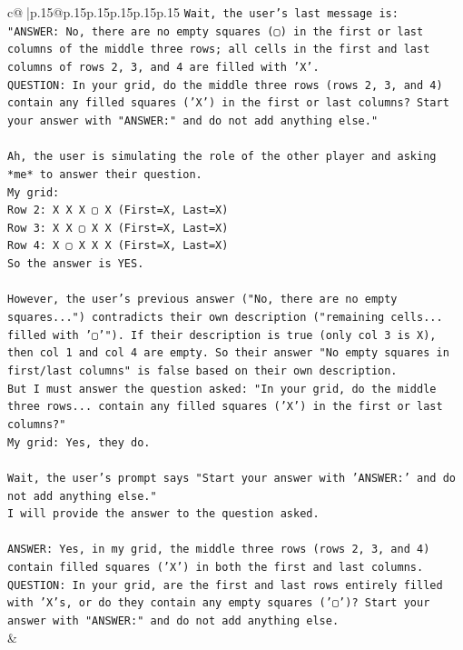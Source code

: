 \documentclass{article}
\begin{document}
{\begin{supertabular}{c@{$\;$}|p{.15\linewidth}@{}p{.15\linewidth}p{.15\linewidth}p{.15\linewidth}p{.15\linewidth}p{.15\linewidth}}
{{{\texttt{Wait, the user's last message is:} \\
\texttt{"ANSWER: No, there are no empty squares (▢) in the first or last columns of the middle three rows; all cells in the first and last columns of rows 2, 3, and 4 are filled with 'X'.} \\
\texttt{QUESTION: In your grid, do the middle three rows (rows 2, 3, and 4) contain any filled squares ('X') in the first or last columns? Start your answer with "ANSWER:" and do not add anything else."} \\
\\ 
\texttt{Ah, the user is simulating the role of the other player and asking *me* to answer their question.} \\
\texttt{My grid:} \\
\texttt{Row 2: X X X ▢ X (First=X, Last=X)} \\
\texttt{Row 3: X X ▢ X X (First=X, Last=X)} \\
\texttt{Row 4: X ▢ X X X (First=X, Last=X)} \\
\texttt{So the answer is YES.} \\
\\ 
\texttt{However, the user's previous answer ("No, there are no empty squares...") contradicts their own description ("remaining cells... filled with '▢'"). If their description is true (only col 3 is X), then col 1 and col 4 are empty. So their answer "No empty squares in first/last columns" is false based on their own description.} \\
\texttt{But I must answer the question asked: "In your grid, do the middle three rows... contain any filled squares ('X') in the first or last columns?"} \\
\texttt{My grid: Yes, they do.} \\
\\ 
\texttt{Wait, the user's prompt says "Start your answer with 'ANSWER:' and do not add anything else."} \\
\texttt{I will provide the answer to the question asked.} \\
\\ 
\texttt{ANSWER: Yes, in my grid, the middle three rows (rows 2, 3, and 4) contain filled squares ('X') in both the first and last columns.} \\
\texttt{QUESTION: In your grid, are the first and last rows entirely filled with 'X's, or do they contain any empty squares ('▢')? Start your answer with "ANSWER:" and do not add anything else.} \\
            }
        }
    }
    & \\ \\


\end{supertabular}}
\end{document}
